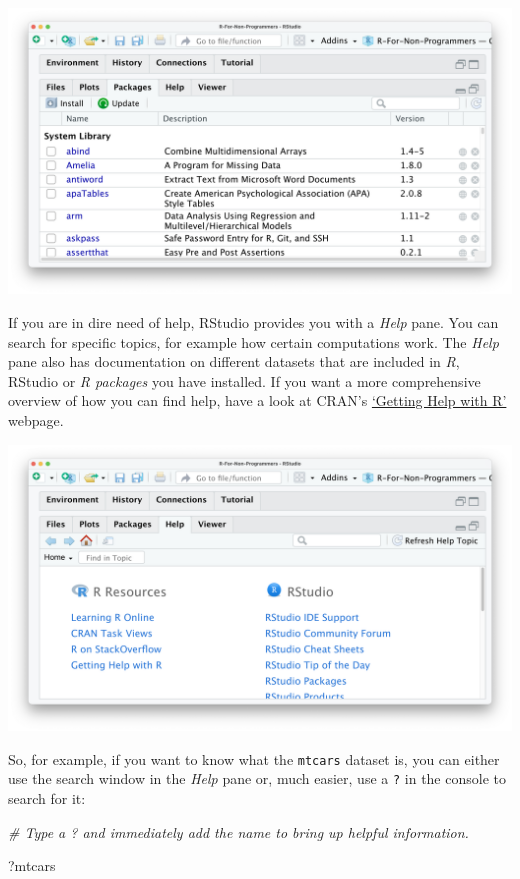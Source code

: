 \documentclass[
]{book}
\newenvironment{Shaded}{\begin{snugshade}}{\end{snugshade}}
\newcommand{\CommentTok}[1]{\textcolor[rgb]{0.56,0.35,0.01}{\textit{#1}}}
\newcommand{\NormalTok}[1]{#1}
\begin{document}
\includegraphics{images/chapter_04_img/05_files_plots_etc/03_rstudio_packages.png}

If you are in dire need of help, RStudio provides you with a \emph{Help} pane. You can search for specific topics, for example how certain computations work. The \emph{Help} pane also has documentation on different datasets that are included in \emph{R}, RStudio or \emph{R packages} you have installed. If you want a more comprehensive overview of how you can find help, have a look at CRAN's \href{https://www.r-project.org/help.html}{`Getting Help with R'} webpage.

\includegraphics{images/chapter_04_img/05_files_plots_etc/04_rstudio_help.png}

So, for example, if you want to know what the \texttt{mtcars} dataset is, you can either use the search window in the \emph{Help} pane or, much easier, use a \texttt{?} in the console to search for it:

\begin{Shaded}
\begin{Highlighting}[]

\CommentTok{\# Type a \textquotesingle{}?\textquotesingle{} and immediately add the name to bring up helpful information.}

\NormalTok{?mtcars}
\end{Highlighting}
\end{Shaded}
\end{document}
